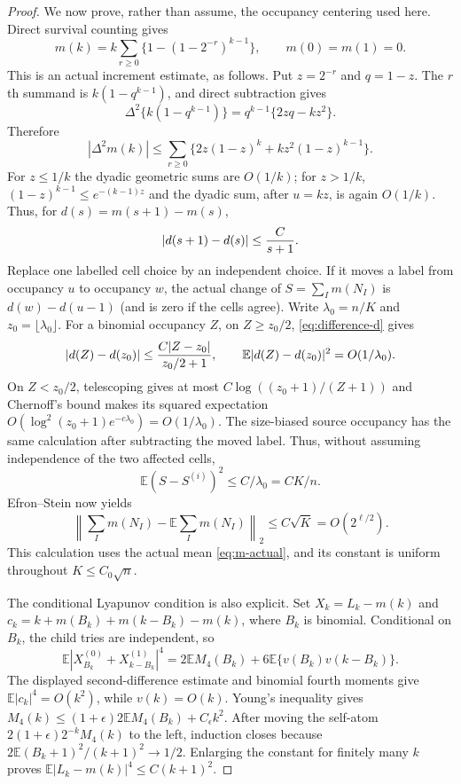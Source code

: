 \documentclass[11pt]{article}
\numberwithin{equation}{section}
\newcommand{\1}{\mathbf 1}\newcommand{\F}{\mathcal F}\newcommand{\D}{\mathcal D}
\begin{document}
\begin{proof}
We now prove, rather than assume, the occupancy centering used here.  Direct
survival counting gives
\begin{equation}
 m(k)=k\sum_{r\ge0}\{1-(1-2^{-r})^{k-1}\},\qquad m(0)=m(1)=0. \label{eq:m-actual}
\end{equation}
This is an actual increment estimate, as follows.  Put $z=2^{-r}$ and
$q=1-z$.  The $r$th summand is $k(1-q^{k-1})$, and direct subtraction gives
\[
 \Delta^2\{k(1-q^{k-1})\}
 =q^{k-1}\{2zq-kz^2\}.
\]
Therefore
\[
 |\Delta^2m(k)|\le\sum_{r\ge0}
 \{2z(1-z)^k+kz^2(1-z)^{k-1}\}.
\]
For $z\le1/k$ the dyadic geometric sums are $O(1/k)$; for $z>1/k$,
$(1-z)^{k-1}\le e^{-(k-1)z}$ and the dyadic sum, after $u=kz$, is again
$O(1/k)$.  Thus, for $d(s)=m(s+1)-m(s)$,
\begin{equation}|d(s+1)-d(s)|\le {C\over s+1}.          \label{eq:difference-d}
\end{equation}
Replace one labelled cell choice by an independent choice.  If it moves a
label from occupancy $u$ to occupancy $w$, the actual change of
$S=\sum_I m(N_I)$ is $d(w)-d(u-1)$ (and is zero if the cells agree).  Write
$\lambda_0=n/K$ and $z_0=\lfloor\lambda_0\rfloor$.  For a binomial
occupancy $Z$, on $Z\ge z_0/2$, \eqref{eq:difference-d} gives
\[
 |d(Z)-d(z_0)|\le {C|Z-z_0|\over z_0/2+1},\qquad
 \mathbb E|d(Z)-d(z_0)|^2=O(1/\lambda_0).
\]
On $Z<z_0/2$, telescoping gives at most
$C\log((z_0+1)/(Z+1))$ and Chernoff's bound makes its squared expectation
$O(\log^2(z_0+1)e^{-c\lambda_0})=O(1/\lambda_0)$.  The size-biased source
occupancy has the same calculation after subtracting the moved label.
Thus, without assuming independence of the two affected cells,
\[
 \mathbb E(S-S^{(i)})^2\le C/\lambda_0=CK/n.
\]
Efron--Stein now yields
\begin{equation}
 \left\|\sum_I m(N_I)-\mathbb E\sum_I m(N_I)\right\|_2
 \le C\sqrt K=O(2^{\ell/2}).                         \label{eq:actual-occ}
\end{equation}
This calculation uses the actual mean \eqref{eq:m-actual}, and its constant
is uniform throughout $K\le C_0\sqrt n$.

The conditional Lyapunov condition is also explicit.  Set
$X_k=L_k-m(k)$ and
$c_k=k+m(B_k)+m(k-B_k)-m(k)$, where $B_k$ is binomial.  Conditional on
$B_k$, the child tries are independent, so
\[
 \mathbb E|X_{B_k}^{(0)}+X_{k-B_k}^{(1)}|^4
 =2\mathbb EM_4(B_k)+6\mathbb E\{v(B_k)v(k-B_k)\}.
\]
The displayed second-difference estimate and binomial fourth moments give
$\mathbb E|c_k|^4=O(k^2)$, while $v(k)=O(k)$.  Young's inequality gives
$M_4(k)\le(1+\epsilon)2\mathbb EM_4(B_k)+C_\epsilon k^2$.
After moving the self-atom $2(1+\epsilon)2^{-k}M_4(k)$ to the left, induction
closes because $2\mathbb E(B_k+1)^2/(k+1)^2\to1/2$.  Enlarging the constant
for finitely many $k$ proves
$\mathbb E|L_k-m(k)|^4\le C(k+1)^2$.


\end{proof}
\end{document}
